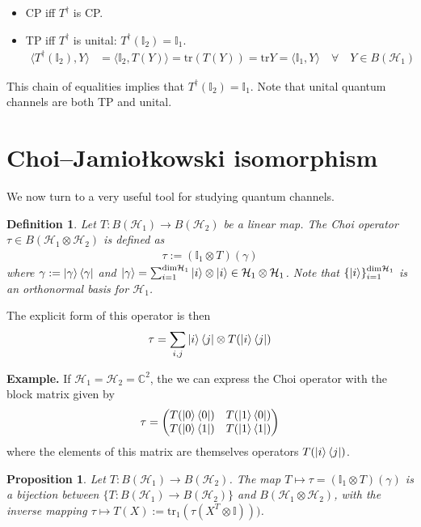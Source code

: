 \documentclass[10pt,oneside,longbibliography]{report}
\newtheorem{proposition}{Proposition}[section]
\newtheorem{definition}{Definition}[section]
\begin{document}
\begin{itemize}
    \item CP iff $T^{\dagger}$ is CP.
    \item TP iff $T^{\dagger}$ is unital: $T^{\dagger}(\mathbb{I}_2)=\mathbb{I}_1$.
    \begin{align}
        \langle T^{\dagger}(\mathbb{I}_2),Y \rangle &= \langle \mathbb{I}_2,T(Y)\rangle = \text{tr}(T(Y))=\text{tr}Y = \langle \mathbb{I}_1, Y\rangle \quad \forall \quad Y \in B(\mathcal{H}_1)
    \end{align}
\end{itemize}
This chain of equalities implies that $T^{\dagger}(\mathbb{I}_2)=\mathbb{I}_1$. Note that unital quantum channels are both TP and unital.

\section{
Choi–Jamiołkowski isomorphism}
We now turn to a very useful tool for studying quantum channels. 
\begin{definition}
Let $T:B(\mathcal{H}_1)\rightarrow B(\mathcal{H}_2)$ be a linear map. The Choi operator $\tau \in B(\mathcal{H}_1 \otimes \mathcal{H}_2)$ is defined as 
\begin{align}
    \tau := (\mathbb{I}_1\otimes T)(\gamma) 
\end{align}
where $\gamma := \ket{\gamma}\bra{\gamma}$ and $\ket{\gamma}=\sum_{i=1}^{\text{dim}\mathcal{H}_1} \ket{i}\otimes \ket{i} \in \mathcal{H}_1 \otimes \mathcal{H}_1 $. Note that $\{\ket{i}\}_{i=1}^{\text{dim}\mathcal{H}_1}$ is an orthonormal basis for $\mathcal{H}_1$. 
\end{definition}
The explicit form of this operator is then
\begin{align}
    \tau = \sum_{i,j} \ket{i}\bra{j} \otimes T(\ket{i}\bra{j})
\end{align}

\begin{tcolorbox}[colframe=black,breakable, colback=brown!8, arc=0pt, outer arc=0pt,boxrule=0.5pt]
\textbf{Example.} If $\mathcal{H}_1 = \mathcal{H}_2=\mathbb{C}^2$, the we can express the Choi operator with the block matrix given by
\begin{align}
    \tau = \begin{pmatrix}
    T(\ket{0}\bra{0}) & T(\ket{1}\bra{0})\\
    T(\ket{0}\bra{1}) & T(\ket{1}\bra{1})
    \end{pmatrix}
\end{align}
where the elements of this matrix are themselves operators $T(\ket{i}\bra{j})$.
\end{tcolorbox}
\begin{proposition}
Let $T: B(\mathcal{H}_1)\rightarrow B(\mathcal{H}_2)$. The map $T \mapsto \tau = (\mathbb{I}_1 \otimes T)(\gamma)$ is a bijection between $\{T: B(\mathcal{H}_1)\rightarrow B(\mathcal{H}_2)\}$ and $B(\mathcal{H}_1 \otimes \mathcal{H}_2)$, with the inverse mapping $\tau \mapsto T(X):=\text{tr}_1(\tau(X^{T}\otimes \mathbb{I})))$.
\end{proposition}
\end{document}
